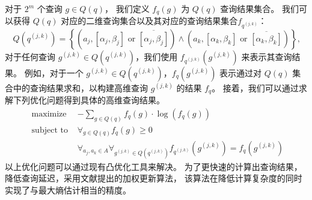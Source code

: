 \begin{enumerate}
对于 $2^m$ 个查询 $g \in Q(q)$，
我们定义 $f_q(g)$ 为 $Q(q)$ 查询结果集合。
我们可以获得 $Q(q)$ 对应的二维查询集合以及其对应的查询结果集合$f_{q^{(j,k)}}$：
$$Q(q^{(j,k)})=\left\{\left(a_{j},\left[\alpha_{j}, \beta_{j}\right] \text { or }\overline{\left[\alpha_{j}, \beta_{j}\right]}\right) \wedge \left(a_{k},\left[\alpha_{k}, \beta_{k}\right] \text { or }\overline{\left[\alpha_{k}, \beta_{k}\right]}\right)\right\}\text{,}$$
对于任何查询 $g^{(j,k)} \in Q(q^{(j,k)})$，我们使用 $f_{q^{(j,k)}}(g^{(j,k)})$ 来表示其查询结果。
例如，对于一个 $g^{(j,k)} \in Q(q^{(j,k)})$，$f_{q}(g^{(j,k)})$ 表示通过对 $Q(q)$ 集合中的查询结果求和，以构建高维查询 $g^{(j,k)}$ 的结果 $f_q$。
接着，我们可以通过求解下列优化问题得到具体的高维查询结果。
$$
\begin{array}{ll}
\text { maximize } & -\sum_{g \in Q(q)} f_{q}(g) \cdot \log \left(f_{q}(g)\right) \\
\text { subject to } & \forall_{g \in Q(q)} f_{q}(g) \geq 0 \\
& \forall_{a_j, a_k \in A} \forall_{g^{(j, k)} \in Q\left(q^{(j, k)}\right)} f_{q^{(j, k)}}(g^{(j, k)})=f_{q}(g^{(j, k)})
\end{array}
$$
以上优化问题可以通过现有凸优化工具来解决。
为了更快速的计算出查询结果，降低查询延迟，\myahead 采用文献{\rm\parencite{yang2020answering}}提出的加权更新算法，
该算法在降低计算复杂度的同时实现了与最大熵估计相当的精度。
\end{enumerate}

